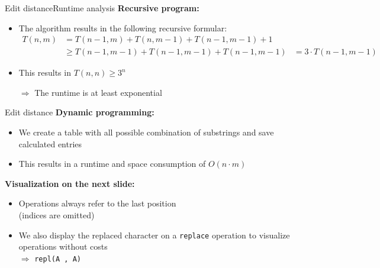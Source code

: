 


\begin{frame}{Edit distance}{Runtime analysis}
  \textbf{Recursive program:}
  \begin{itemize}
    \item
      The algorithm results in the following recursive formular:
      \begin{align*}
        T(n, m) &= T(n-1, m) + T(n, m-1) + T(n-1, m-1) + 1\\
        & \geq T(n-1, m-1) + T(n-1, m-1) + T(n-1, m-1)
        & = 3 \cdot T(n-1, m-1)
      \end{align*}
    \item
      This results in {\color{Mittel-Blau}$T(n, n) \geq 3^n$}
    \item[$\Rightarrow$]
      The runtime is at least {\color{Mittel-Blau}exponential}
  \end{itemize}
\end{frame}


\begin{frame}{Edit distance}
  \textbf{Dynamic programming:}
  \begin{itemize}
    \item
      We create a table with all possible combination of substrings and save
      calculated entries
    \item
      This results in a runtime and space consumption of
      {\color{Mittel-Blau}$O(n \cdot m)$}
  \end{itemize}
  \vspace{1em}
  \textbf{Visualization on the next slide:}
  \begin{itemize}
    \item
      Operations always refer to the last position\\
      (indices are omitted)
    \item
      We also display the replaced character on a \texttt{replace} operation
      to visualize operations without costs\\
      $\Rightarrow$ \texttt{\color{Mittel-Blau}repl(\color{Mittel-Gruen}A%
        \color{Mittel-Blau}, \color{Mittel-Gruen}A\color{Mittel-Blau})}
  \end{itemize}
\end{frame}

